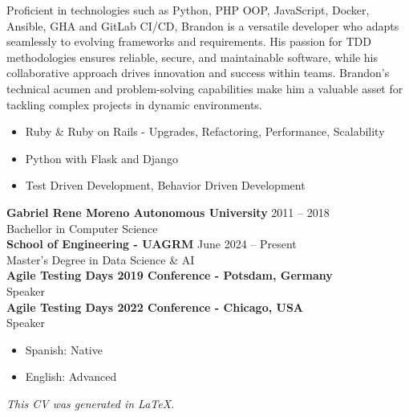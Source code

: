 Proficient in technologies such as Python, PHP OOP, JavaScript, Docker, Ansible, GHA and GitLab CI/CD, Brandon is a versatile developer who adapts seamlessly to evolving frameworks and requirements. His passion for TDD methodologies ensures reliable, secure, and maintainable software, while his collaborative approach drives innovation and success within teams. Brandon’s technical acumen and problem-solving capabilities make him a valuable asset for tackling complex projects in dynamic environments.

\begin{itemize}
    \setlength{\itemsep}{0pt} %
    \setlength{\topsep}{0pt}  %
    \setlength{\parsep}{0pt}  %
    \setlength{\partopsep}{0pt} %
    \item Ruby \& Ruby on Rails - Upgrades, Refactoring, Performance, Scalability
    \item Python with Flask and Django
    \item Test Driven Development, Behavior Driven Development
\end{itemize}

\begingroup

% 






\endgroup

\textbf{Gabriel Rene Moreno Autonomous University} \hfill 2011 -- 2018\\
Bachellor in Computer Science\\

\textbf{School of Engineering - UAGRM} \hfill June 2024 -- Present\\
Master's Degree in Data Science \& AI\\

\textbf{Agile Testing Days 2019 Conference - Potsdam, Germany}\\
Speaker\\
\textbf{Agile Testing Days 2022 Conference - Chicago, USA}\\
Speaker\\

\begin{itemize}
    \item Spanish: Native
    \item English: Advanced
\end{itemize}

\vfill
\begin{center}
    \textit{This CV was generated in LaTeX.}
\end{center}

